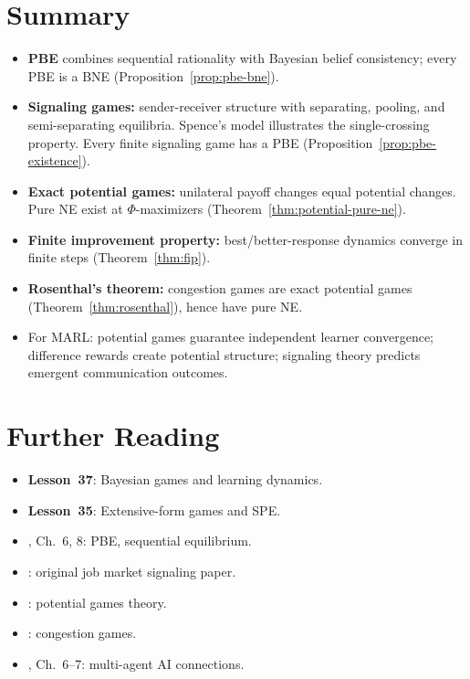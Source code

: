 \documentclass[11pt,a4paper]{article}
\begin{document}

\section{Summary}
\label{sec:summary}

\begin{itemize}
    \item \textbf{PBE} combines sequential rationality with Bayesian
    belief consistency; every PBE is a BNE
    (Proposition~\ref{prop:pbe-bne}).
    \item \textbf{Signaling games:} sender-receiver structure with
    separating, pooling, and semi-separating equilibria. Spence's model
    illustrates the single-crossing property. Every finite signaling
    game has a PBE (Proposition~\ref{prop:pbe-existence}).
    \item \textbf{Exact potential games:} unilateral payoff changes
    equal potential changes. Pure NE exist at $\Phi$-maximizers
    (Theorem~\ref{thm:potential-pure-ne}).
    \item \textbf{Finite improvement property:} best/better-response
    dynamics converge in finite steps (Theorem~\ref{thm:fip}).
    \item \textbf{Rosenthal's theorem:} congestion games are exact
    potential games (Theorem~\ref{thm:rosenthal}), hence have pure NE.
    \item For MARL: potential games guarantee independent learner
    convergence; difference rewards create potential structure;
    signaling theory predicts emergent communication outcomes.
\end{itemize}


\section{Further Reading}
\label{sec:further-reading}

\begin{itemize}
    \item \textbf{Lesson~37}: Bayesian games and learning dynamics.
    \item \textbf{Lesson~35}: Extensive-form games and SPE.
    \item \citet{fudenberg1991}, Ch.~6, 8: PBE, sequential equilibrium.
    \item \citet{spence1973}: original job market signaling paper.
    \item \citet{monderer1996}: potential games theory.
    \item \citet{rosenthal1973}: congestion games.
    \item \citet{shoham2008}, Ch.~6--7: multi-agent AI connections.
\end{itemize}


\end{document}
